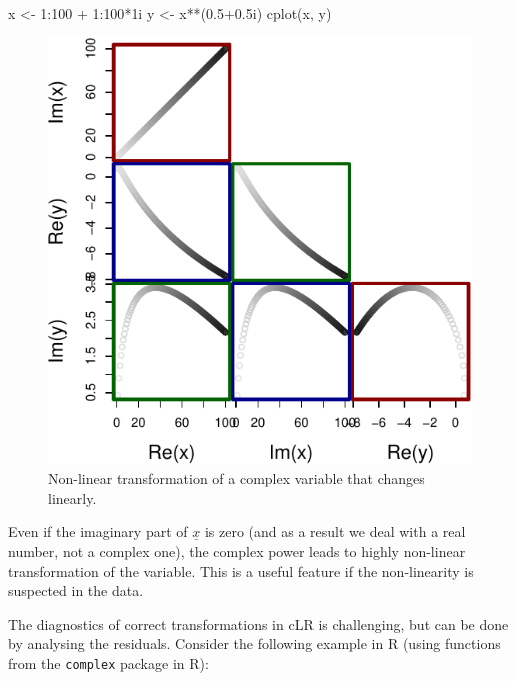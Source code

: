 \documentclass[
]{book}
\newenvironment{Shaded}{\begin{snugshade}}{\end{snugshade}}
\newcommand{\DecValTok}[1]{\textcolor[rgb]{0.00,0.00,0.81}{#1}}
\newcommand{\FloatTok}[1]{\textcolor[rgb]{0.00,0.00,0.81}{#1}}
\newcommand{\FunctionTok}[1]{\textcolor[rgb]{0.00,0.00,0.00}{#1}}
\newcommand{\NormalTok}[1]{#1}
\newcommand{\OtherTok}[1]{\textcolor[rgb]{0.56,0.35,0.01}{#1}}
\newcommand{\SpecialCharTok}[1]{\textcolor[rgb]{0.00,0.00,0.00}{#1}}
\begin{document}
\begin{Shaded}
\begin{Highlighting}[]
\NormalTok{x }\OtherTok{\textless{}{-}} \DecValTok{1}\SpecialCharTok{:}\DecValTok{100} \SpecialCharTok{+} \DecValTok{1}\SpecialCharTok{:}\DecValTok{100}\SpecialCharTok{*}\NormalTok{1i}
\NormalTok{y }\OtherTok{\textless{}{-}}\NormalTok{ x}\SpecialCharTok{**}\NormalTok{(}\FloatTok{0.5+0.5}\NormalTok{i)}
\FunctionTok{cplot}\NormalTok{(x, y)}
\end{Highlighting}
\end{Shaded}

\begin{figure}
\centering
\includegraphics{Svetunkov---Svetunkov---Complex-Valued-Econometrics_files/figure-latex/unnamed-chunk-37-1.pdf}
\caption{\label{fig:unnamed-chunk-37}Non-linear transformation of a complex variable that changes linearly.}
\end{figure}

Even if the imaginary part of \(\underline{x}\) is zero (and as a result we deal with a real number, not a complex one), the complex power leads to highly non-linear transformation of the variable. This is a useful feature if the non-linearity is suspected in the data.

The diagnostics of correct transformations in cLR is challenging, but can be done by analysing the residuals. Consider the following example in R (using functions from the \texttt{complex} package in R):
\end{document}
